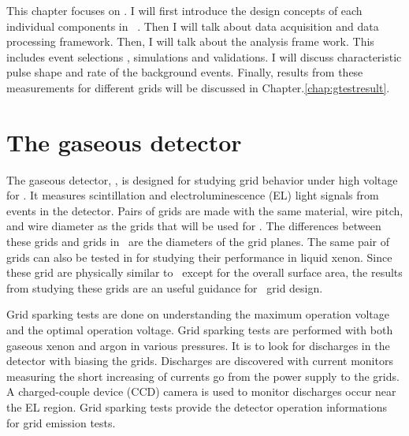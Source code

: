 


This chapter focuses on \gtest . I will first introduce the design concepts of each individual components in \gtest\ . Then I will talk about data acquisition and data processing framework. Then, I will talk about the analysis frame work. This includes event selections , simulations and validations. I will discuss characteristic pulse shape and rate of the background events. Finally, results from these measurements for different grids will be discussed in Chapter.\ref{chap:gtestresult}.

\section{The gaseous detector}
The gaseous detector, \gtest , is designed for studying grid behavior under high voltage for \lze . It measures scintillation and electroluminescence (EL) light signals from events in the detector. Pairs of grids are made with the same material, wire pitch, and wire diameter as the grids that will be used for \lze . The differences between these grids and grids in \lze\ are the diameters of the grid planes. The same pair of grids can also be tested in \phaseone  for studying their performance in liquid xenon. Since these grid are physically similar to \lze\ except for the overall surface area, the results from studying these grids are an useful guidance for \lze\ grid design. 

Grid sparking tests are done on understanding the maximum operation voltage and the optimal operation voltage. Grid sparking tests are performed with both gaseous xenon and argon in various pressures. It is to look for discharges in the detector with biasing the grids. Discharges are discovered with current monitors measuring the short increasing of currents go from the power supply to the grids. A charged-couple device (CCD) camera is used to monitor discharges occur near the EL region. Grid sparking tests provide the detector operation informations for grid emission tests. 

